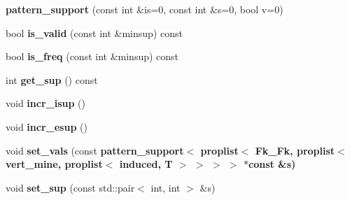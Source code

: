 \begin{CompactItemize}
\item 
\textbf{pattern\_\-support} (const int \&is=0, const int \&s=0, bool v=0)\label{classpattern__support_3_01proplist_3_01Fk__Fk_00_01proplist_3_01vert__mine_00_01proplist_3_01induced_00_01T_01_4_01_4_01_4_01_4_c6d2dcd47e9346ef942b8629d3fb07f9}

\item 
bool \textbf{is\_\-valid} (const int \&minsup) const \label{classpattern__support_3_01proplist_3_01Fk__Fk_00_01proplist_3_01vert__mine_00_01proplist_3_01induced_00_01T_01_4_01_4_01_4_01_4_84654f7b9d9e85f1e03f8452065ce7fb}

\item 
bool \textbf{is\_\-freq} (const int \&minsup) const \label{classpattern__support_3_01proplist_3_01Fk__Fk_00_01proplist_3_01vert__mine_00_01proplist_3_01induced_00_01T_01_4_01_4_01_4_01_4_d164ceeb12af51a101a1ff32c2bdac8a}

\item 
int \textbf{get\_\-sup} () const \label{classpattern__support_3_01proplist_3_01Fk__Fk_00_01proplist_3_01vert__mine_00_01proplist_3_01induced_00_01T_01_4_01_4_01_4_01_4_7eca6e78be7cc46242fe5197efc197e8}

\item 
void \textbf{incr\_\-isup} ()\label{classpattern__support_3_01proplist_3_01Fk__Fk_00_01proplist_3_01vert__mine_00_01proplist_3_01induced_00_01T_01_4_01_4_01_4_01_4_3b332cdf496d447b5704adc9d2788de0}

\item 
void \textbf{incr\_\-esup} ()\label{classpattern__support_3_01proplist_3_01Fk__Fk_00_01proplist_3_01vert__mine_00_01proplist_3_01induced_00_01T_01_4_01_4_01_4_01_4_bb0b8b386566a1b516f4bb6cc14194a1}

\item 
void \textbf{set\_\-vals} (const \bf{pattern\_\-support}$<$ \bf{proplist}$<$ Fk\_\-Fk, \bf{proplist}$<$ vert\_\-mine, \bf{proplist}$<$ induced, T $>$ $>$ $>$ $>$ $\ast$const \&s)\label{classpattern__support_3_01proplist_3_01Fk__Fk_00_01proplist_3_01vert__mine_00_01proplist_3_01induced_00_01T_01_4_01_4_01_4_01_4_c59ffec4a2e344346467317ac84c6ecd}

\item 
void \textbf{set\_\-sup} (const std::pair$<$ int, int $>$ \&s)\label{classpattern__support_3_01proplist_3_01Fk__Fk_00_01proplist_3_01vert__mine_00_01proplist_3_01induced_00_01T_01_4_01_4_01_4_01_4_469b8a8e2cd24907109550547803cb1a}

\end{CompactItemize}
